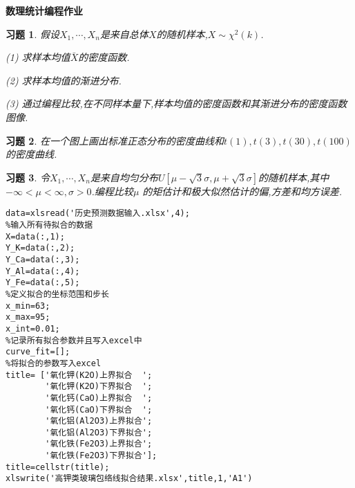 \documentclass[a4paper,oneside,12pt]{ctexart}
\theoremstyle{plain}
\newtheorem{exercise}{习题}
\theoremstyle{nonumberplain}
\theoremstyle{nonumberplain}
\begin{document}
    \begin{center}
        \bfseries\LARGE
        数理统计编程作业
    \end{center}

    \begin{exercise}
        \label{ex:1}
        假设$X_1,\cdots,X_n$是来自总体$X$的随机样本,$X\sim\chi^2(k)$.

        (1) 求样本均值$\bar{X}$的密度函数.

        (2) 求样本均值的渐进分布.

        (3) 通过编程比较,在不同样本量下,样本均值的密度函数和其渐进分布的密度函数图像.
    \end{exercise}

    \begin{exercise}
        \label{ex:2}
        在一个图上画出标准正态分布的密度曲线和$t(1),t(3),t(30),t(100)$的密度曲线.
    \end{exercise}

    \begin{exercise}
        \label{ex:3}
        令$X_1,\cdots,X_n$是来自均匀分布$U[\mu-\sqrt{3}\sigma,\mu+\sqrt{3}\sigma]$的随机样本,其中$-\infty <\mu<\infty,\sigma>0$.编程比较$\mu$
        的矩估计和极大似然估计的偏,方差和均方误差.
    \end{exercise}

\begin{lstlisting}
data=xlsread('历史预测数据输入.xlsx',4);
%输入所有待拟合的数据
X=data(:,1);
Y_K=data(:,2);
Y_Ca=data(:,3);
Y_Al=data(:,4);
Y_Fe=data(:,5);
%定义拟合的坐标范围和步长
x_min=63;
x_max=95;
x_int=0.01;
%记录所有拟合参数并且写入excel中
curve_fit=[];
%将拟合的参数写入excel
title= ['氧化钾(K2O)上界拟合  ';
        '氧化钾(K2O)下界拟合  ';
        '氧化钙(CaO)上界拟合  ';
        '氧化钙(CaO)下界拟合  ';
        '氧化铝(Al2O3)上界拟合';
        '氧化铝(Al2O3)下界拟合';
        '氧化铁(Fe2O3)上界拟合';
        '氧化铁(Fe2O3)下界拟合'];
title=cellstr(title);
xlswrite('高钾类玻璃包络线拟合结果.xlsx',title,1,'A1')
\end{lstlisting}
\end{document}

